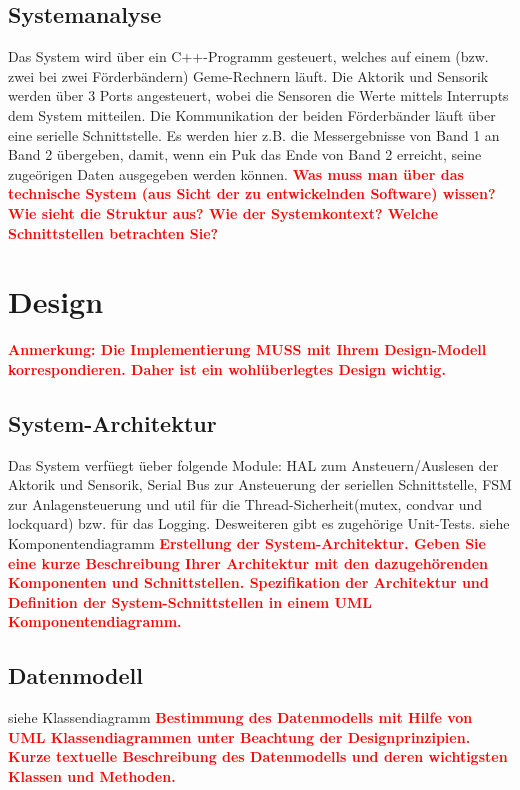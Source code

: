 \documentclass[oneside,a4paper,titlepage]{scrartcl} %
\begin{document}
\newpage

\subsection{Systemanalyse}
Das System wird \"uber ein C++-Programm gesteuert, welches auf einem (bzw. zwei bei zwei F\"orderb\"andern) Geme-Rechnern l\"auft. Die Aktorik und Sensorik werden \"uber 3 Ports angesteuert, wobei die Sensoren die Werte mittels Interrupts dem System mitteilen.\newline
Die Kommunikation der beiden F\"orderb\"ander l\"auft \"uber eine serielle Schnittstelle. Es werden hier z.B. die Messergebnisse von Band 1 an Band 2 \"ubergeben, damit, wenn ein Puk das Ende von Band 2 erreicht, seine zuge\"origen Daten ausgegeben werden k\"onnen. \newline
\newline
\textcolor{red}{\textbf{Was muss man über das technische System (aus Sicht der zu entwickelnden Software) wissen?
Wie sieht die Struktur aus? Wie der Systemkontext? Welche Schnittstellen betrachten Sie?}}

\newpage

\section{Design}
\textcolor{red}{\textbf{Anmerkung: Die Implementierung MUSS mit Ihrem Design-Modell korrespondieren.
Daher ist ein wohlüberlegtes Design wichtig.}}

\subsection{System-Architektur}
Das System verf\"uegt \"ueber folgende Module: HAL zum Ansteuern/Auslesen der Aktorik und Sensorik, Serial Bus zur Ansteuerung der seriellen Schnittstelle, FSM zur Anlagensteuerung und util f\"ur die Thread-Sicherheit(mutex, condvar und lockquard) bzw. f\"ur das Logging. Desweiteren gibt es zugeh\"orige Unit-Tests. \newline
siehe Komponentendiagramm \newline
\textcolor{red}{\textbf{Erstellung der System-Architektur. Geben Sie eine kurze Beschreibung Ihrer
Architektur mit den dazugehörenden Komponenten und Schnittstellen.
Spezifikation der Architektur und Definition der System-Schnittstellen in einem UML Komponentendiagramm.}}

\subsection{Datenmodell}
siehe Klassendiagramm \newline
\textcolor{red}{\textbf{Bestimmung des Datenmodells mit Hilfe von UML Klassendiagrammen
unter Beachtung der Designprinzipien. Kurze textuelle Beschreibung des Datenmodells und
deren wichtigsten Klassen und Methoden.}}
\end{document}

